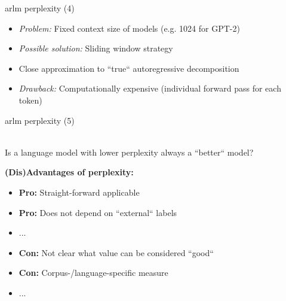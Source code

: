 \begin{frame}{arlm perplexity (4)}

\vfill

\begin{itemize}
	\item \textit{Problem:} Fixed context size of models (e.g. 1024 for GPT-2) 
\end{itemize}

\begin{figure}
    \centering
\end{figure}

\begin{itemize}
	\item \textit{Possible solution:} Sliding window strategy
	\item Close approximation to ``true`` autoregressive decomposition
	\item \textit{Drawback:} Computationally expensive (individual forward pass for each token)
\end{itemize}

\vfill

\end{frame}


\begin{frame}{arlm perplexity (5)}

\vfill

\ques\\ Is a language model with lower perplexity always a ``better`` model?

\vspace{.5cm}

\textbf{(Dis)Advantages of perplexity:}

\begin{itemize}
	\item \textbf{Pro:} Straight-forward applicable
	\item \textbf{Pro:} Does not depend on ``external`` labels
	\item ...
	\item \textbf{Con:} Not clear what value can be considered ``good``
	\item \textbf{Con:} Corpus-/language-specific measure
	\item ...
\end{itemize}

\vfill

\end{frame}

